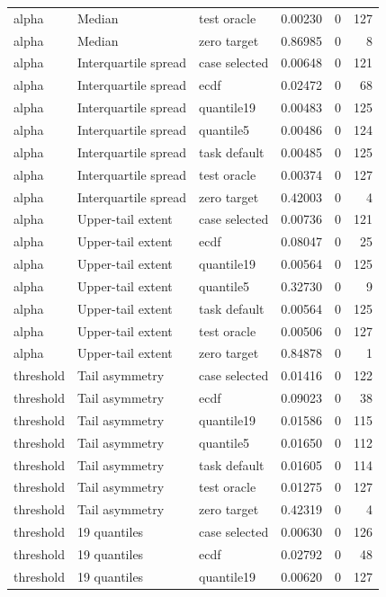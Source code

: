\begin{longtable}{lllrrr}
alpha & Median & test oracle & 0.00230 & 0 & 127\\
alpha & Median & zero target & 0.86985 & 0 & 8\\
alpha & Interquartile spread & case selected & 0.00648 & 0 & 121\\
alpha & Interquartile spread & ecdf & 0.02472 & 0 & 68\\
alpha & Interquartile spread & quantile19 & 0.00483 & 0 & 125\\
alpha & Interquartile spread & quantile5 & 0.00486 & 0 & 124\\
alpha & Interquartile spread & task default & 0.00485 & 0 & 125\\
alpha & Interquartile spread & test oracle & 0.00374 & 0 & 127\\
alpha & Interquartile spread & zero target & 0.42003 & 0 & 4\\
alpha & Upper-tail extent & case selected & 0.00736 & 0 & 121\\
alpha & Upper-tail extent & ecdf & 0.08047 & 0 & 25\\
alpha & Upper-tail extent & quantile19 & 0.00564 & 0 & 125\\
alpha & Upper-tail extent & quantile5 & 0.32730 & 0 & 9\\
alpha & Upper-tail extent & task default & 0.00564 & 0 & 125\\
alpha & Upper-tail extent & test oracle & 0.00506 & 0 & 127\\
alpha & Upper-tail extent & zero target & 0.84878 & 0 & 1\\
threshold & Tail asymmetry & case selected & 0.01416 & 0 & 122\\
threshold & Tail asymmetry & ecdf & 0.09023 & 0 & 38\\
threshold & Tail asymmetry & quantile19 & 0.01586 & 0 & 115\\
threshold & Tail asymmetry & quantile5 & 0.01650 & 0 & 112\\
threshold & Tail asymmetry & task default & 0.01605 & 0 & 114\\
threshold & Tail asymmetry & test oracle & 0.01275 & 0 & 127\\
threshold & Tail asymmetry & zero target & 0.42319 & 0 & 4\\
threshold & 19 quantiles & case selected & 0.00630 & 0 & 126\\
threshold & 19 quantiles & ecdf & 0.02792 & 0 & 48\\
threshold & 19 quantiles & quantile19 & 0.00620 & 0 & 127\\

\end{longtable}
